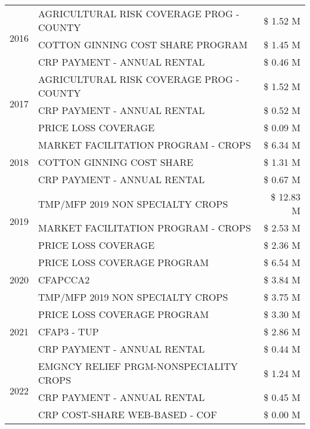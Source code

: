 \begin{tabular}{llr}
\cline{1-3}
\multirow[t]{3}{*}{2016} & AGRICULTURAL RISK COVERAGE PROG - COUNTY & \$ 1.52 M \\
 & COTTON GINNING COST SHARE PROGRAM & \$ 1.45 M \\
 & CRP PAYMENT - ANNUAL RENTAL & \$ 0.46 M \\
\cline{1-3}
\multirow[t]{3}{*}{2017} & AGRICULTURAL RISK COVERAGE PROG - COUNTY & \$ 1.52 M \\
 & CRP PAYMENT - ANNUAL RENTAL & \$ 0.52 M \\
 & PRICE LOSS COVERAGE & \$ 0.09 M \\
\cline{1-3}
\multirow[t]{3}{*}{2018} & MARKET FACILITATION PROGRAM - CROPS & \$ 6.34 M \\
 & COTTON GINNING COST SHARE & \$ 1.31 M \\
 & CRP PAYMENT - ANNUAL RENTAL & \$ 0.67 M \\
\cline{1-3}
\multirow[t]{3}{*}{2019} & TMP/MFP 2019 NON SPECIALTY CROPS & \$ 12.83 M \\
 & MARKET FACILITATION PROGRAM - CROPS & \$ 2.53 M \\
 & PRICE LOSS COVERAGE & \$ 2.36 M \\
\cline{1-3}
\multirow[t]{3}{*}{2020} & PRICE LOSS COVERAGE PROGRAM & \$ 6.54 M \\
 & CFAPCCA2 & \$ 3.84 M \\
 & TMP/MFP 2019 NON SPECIALTY CROPS & \$ 3.75 M \\
\cline{1-3}
\multirow[t]{3}{*}{2021} & PRICE LOSS COVERAGE PROGRAM & \$ 3.30 M \\
 & CFAP3 - TUP & \$ 2.86 M \\
 & CRP PAYMENT - ANNUAL RENTAL & \$ 0.44 M \\
\cline{1-3}
\multirow[t]{3}{*}{2022} & EMGNCY RELIEF PRGM-NONSPECIALITY CROPS & \$ 1.24 M \\
 & CRP PAYMENT - ANNUAL RENTAL & \$ 0.45 M \\
 & CRP COST-SHARE WEB-BASED - COF & \$ 0.00 M \\
\cline{1-3}
\bottomrule
\end{tabular}
